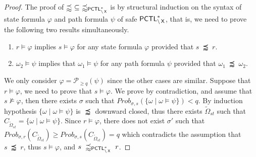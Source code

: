\documentclass{LMCS}
\def\phi{\varphi}
\DeclareMathOperator{\X}{\text{\sf X}}
\newcommand{\WSi}{\precapprox}
\newcommand{\PCTL}{{\sf PCTL}}
\newcommand{\MC}[1]{\mathcal{#1}}
\newcommand{\MI}[1]{\mathit{#1}}
\newcommand{\SEPCTLSWN}{\precapprox_{\PCTL^{*}_{\backslash\X}}}
\newcommand{\MEASURE}{\mathit{Prob}}
\begin{document}
\begin{proof}
  The proof of $\WSi~\subseteq~\SEPCTLSWN$ is by structural induction
  on the syntax of state formula $\phi$ and path formula $\psi$ of
  safe $\PCTL_{\backslash\X}^{*}$, that is, we need to prove the
  following two results simultaneously.
\begin{enumerate}[(1)]
\item $r\models\phi$ implies $s\models\phi$ for any state formula $\phi$ provided that $s~\WSi~r$.
\item $\omega_2\models\psi$ implies that $\omega_1\models\psi$ for any path formula $\psi$ provided that $\omega_1~\WSi~\omega_2$.
\end{enumerate}
We only consider $\phi=\MC{P}_{\geq q}(\psi)$ since the other cases
are similar. Suppose that $r\models\phi$, we need to prove that
$s\models\phi$. We prove by contradiction, and assume that
$s\not\models\phi$, then there exists $\sigma$ such that
$\MEASURE_{\sigma,s}(\{\omega\mid\omega\models\psi\})<q$. By induction
hypothesis $\{\omega\mid\omega\models\psi\}$ is $\WSi$ downward
closed, thus there exists $\widetilde{\Omega}_{\MI{st}}$ such that
$C_{\widetilde{\Omega}_{\MI{st}}}=\{\omega\mid\omega\models\psi\}$. Since
$r\models\phi$, there does not exist $\sigma'$ such that
$\MEASURE_{\sigma,r}(C_{\widetilde{\Omega}_{\MI{st}}})\geq
\MEASURE_{\sigma,s}(C_{\widetilde{\Omega}_{\MI{st}}})=q$ which contradicts
the assumption that $s~\WSi~r$, thus $s\models\phi$, and
$s~\SEPCTLSWN~r$.
\end{proof}
\end{document}
